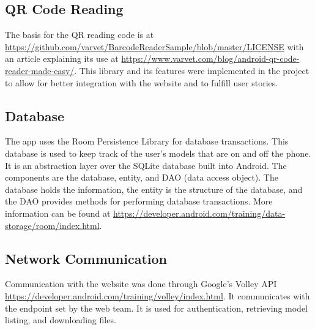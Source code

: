 \subsection{QR Code Reading}
    The basis for the QR reading code is at \url{https://github.com/varvet/BarcodeReaderSample/blob/master/LICENSE} with an article explaining its use at \url{https://www.varvet.com/blog/android-qr-code-reader-made-easy/}. This library and its features were implemented in the project to allow for better integration with the website and to fulfill user stories.

\subsection{Database}
    The app uses the Room Persistence Library for database transactions. This database is used to keep track of the user's models that are on and off the phone. It is an abstraction layer over the SQLite database built into Android. The components are the database, entity, and DAO (data access object). The database holds the information, the entity is the structure of the database, and the DAO provides methods for performing database transactions. More information can be found at \url{https://developer.android.com/training/data-storage/room/index.html}.

\subsection{Network Communication}
    Communication with the website was done through Google's Volley API \url{https://developer.android.com/training/volley/index.html}. It communicates with the endpoint set by the web team. It is used for authentication, retrieving model listing, and downloading files.